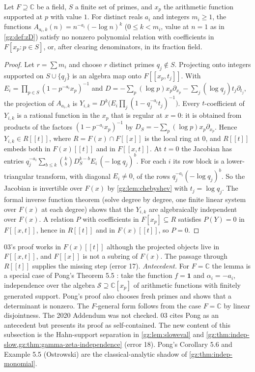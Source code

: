 \documentclass[11pt,a4paper]{article}
\numberwithin{equation}{section}
\theoremstyle{definition}
\theoremstyle{remark}
\newcommand{\C}{\mathbb C}
\newcommand{\src}[1]{\textup{[#1]}}
\newcommand{\merge}{\textup{[merge]}}
\begin{document}
\begin{lemma}[Finite-prime independence \src{03}; proof completed \merge]\label{gz:lem:primeindependence}
Let $F\supseteq\C$ be a field, $S$ a finite set of primes, and $x_p$ the
arithmetic function supported at $p$ with value $1$. For distinct reals $a_i$
and integers $m_i\ge1$, the functions $A_{a_i,k}(n)=n^{-a_i}(-\log n)^k$
($0\le k<m_i$, value at $n=1$ as in \cref{gz:def:zD}) satisfy no nonzero
polynomial relation with coefficients in $F[x_p:p\in S]$, or, after clearing
denominators, in its fraction field.
\end{lemma}
\begin{proof}
Let $r=\sum m_i$ and choose $r$ distinct primes $q_j\notin S$. Projecting onto
integers supported on $S\cup\{q_j\}$ is an algebra map onto $F[[x_p,t_j]]$.
With $E_i=\prod_{p\in S}(1-p^{-a_i}x_p)^{-1}$ and
$D=-\sum_p(\log p)x_p\partial_{x_p}-\sum_j(\log q_j)t_j\partial_{t_j}$, the
projection of $A_{a_i,k}$ is
$Y_{i,k}=D^k\bigl(E_i\prod_j(1-q_j^{-a_i}t_j)^{-1}\bigr)$. Every
$t$-coefficient of $Y_{i,k}$ is a rational function in the $x_p$ that is
regular at $x=0$: it is obtained from products of the factors
$(1-p^{-a_i}x_p)^{-1}$ by $D_S=-\sum_p(\log p)x_p\partial_{x_p}$. Hence
$Y_{i,k}\in R[[t]]$, where $R=F(x)\cap F[[x]]$ is the local ring at $0$, and
$R[[t]]$ embeds both in $F(x)[[t]]$ and in $F[[x,t]]$. At $t=0$
the Jacobian has entries
$q_j^{-a_i}\sum_{b\le k}\binom kb D_S^{k-b}E_i\,(-\log q_j)^b$. For
each $i$ its row block is a lower-triangular transform, with diagonal
$E_i\ne0$, of the rows $q_j^{-a_i}(-\log q_j)^b$. So the Jacobian is
invertible over $F(x)$ by \cref{gz:lem:chebyshev} with $t_j=\log q_j$. The
formal inverse function theorem (solve degree by degree, one finite linear
system over $F(x)$ at each degree) shows that the $Y_{i,k}$ are algebraically
independent over $F(x)$. A relation $P$ with coefficients in $F[x_p]\subseteq R$
satisfies $P(Y)=0$ in $F[[x,t]]$, hence in $R[[t]]$ and in $F(x)[[t]]$, so $P=0$.
\end{proof}
03's proof works in $F(x)[[t]]$ although the projected objects live in
$F[[x,t]]$, and $F[[x]]$ is not a subring of $F(x)$. The passage through
$R[[t]]$ supplies the missing step (error 17). \emph{Antecedent.} For $F=\C$
the lemma is a special case of Pong's Theorem 5.5 \cite{Pong}: take the
function $f=\mathbf1$ and $\alpha_i=-a_i$, independence over the algebra
$\mathcal S\supseteq\C[x_p]$ of arithmetic functions with finitely generated
support. Pong's proof also chooses fresh primes and shows that a determinant
is nonzero. The $F$-general form follows from the case $F=\C$ by linear
disjointness. The 2020 Addendum \cite{PongAdd} was not checked. 03 cites Pong as an antecedent but presents its proof as
self-contained. The new content of this subsection is the Hahn-support
separation in \cref{gz:lem:sloweval} and \cref{gz:thm:indep-slow,gz:thm:gamma-zeta-independence}
(error 18). Pong's Corollary 5.6 and Example 5.5 (Ostrowski) are the
classical-analytic shadow of \cref{gz:thm:indep-monomial}.
\end{document}
